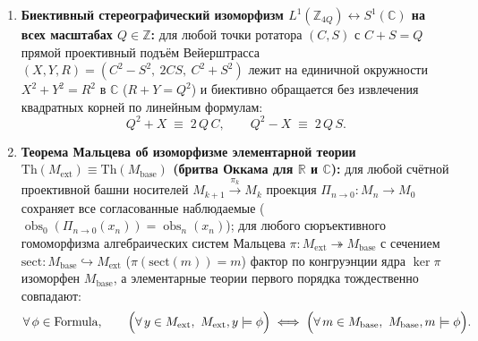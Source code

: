 \begin{theorem}
\begin{enumerate}[label=\textbf{(\arabic*)},leftmargin=*]
  \begin{equation}
    \label{eq:math-stern-brocot-wronskian}
    \Delta(p_L, q_L, p_M, q_M) \;=\; \Delta(p_M, q_M, p_R, q_R) \;\equiv\; \Delta(p_L, q_L, p_R, q_R),
  \end{equation}
  а под действием любой целочисленной матрицы уточнения $A = \begin{pmatrix} a & b \\ c & d \end{pmatrix} \in \mathrm{Mat}_{2\times 2}(\mathbb{Z})$ на концы вилки вронскиан умножается на определитель матрицы:
  \begin{equation}
    \label{eq:math-sl2-interval-wronskian}
    \Delta(p_L', q_L', p_R', q_R') \;\equiv\; (a d - b c)\,\Delta(p_L, q_L, p_R, q_R),
  \end{equation}
  при этом вдоль любого слова уточнений $w \in \mathrm{List}\,\mathbb{Z}$ свёрнутая вилка $[L_w, U_w] = \operatorname{bracketFold}(l_0, u_0, w)$ монотонно зажимает вещественное значение $X \in \mathbb{R}$ ($l_0 \le L_w \le X \le U_w \le u_0$, $0 \le U_w - L_w \le u_0 - l_0$) и однозначно определяет его при смыкании ($U_w - L_w = 0 \implies L_w = U_w = X$).
\item \textbf{Биективный стереографический изоморфизм $L^1(\mathbb{Z}_{4Q}) \leftrightarrow S^1(\mathbb{C})$ на всех масштабах $Q \in \mathbb{Z}$:}
  для любой точки ротатора $(C, S)$ с $C + S = Q$ прямой проективный подъём Вейерштрасса $(X, Y, R) = (C^2 - S^2,\ 2CS,\ C^2 + S^2)$ лежит на единичной окружности $X^2 + Y^2 = R^2$ в $\mathbb{C}$ ($R + Y = Q^2$) и биективно обращается без извлечения квадратных корней по линейным формулам:
  \begin{equation}
    \label{eq:math-weierstrass-bijection-inverse}
    Q^2 + X \;\equiv\; 2\,Q\,C, \qquad Q^2 - X \;\equiv\; 2\,Q\,S.
  \end{equation}
\item \textbf{Теорема Мальцева об изоморфизме элементарной теории $\mathrm{Th}(M_{\mathrm{ext}}) \equiv \mathrm{Th}(M_{\mathrm{base}})$ (бритва Оккама для $\mathbb{R}$ и $\mathbb{C}$):}
  для любой счётной проективной башни носителей $M_{k+1} \xrightarrow{\pi_k} M_k$ проекция $\Pi_{n \to 0} : M_n \to M_0$ сохраняет все согласованные наблюдаемые ($\operatorname{obs}_0(\Pi_{n \to 0}(x_n)) = \operatorname{obs}_n(x_n)$); для любого сюръективного гомоморфизма алгебраических систем Мальцева $\pi : M_{\mathrm{ext}} \twoheadrightarrow M_{\mathrm{base}}$ с сечением $\mathrm{sect} : M_{\mathrm{base}} \hookrightarrow M_{\mathrm{ext}}$ ($\pi(\mathrm{sect}(m)) = m$) фактор по конгруэнции ядра $\ker\pi$ изоморфен $M_{\mathrm{base}}$, а элементарные теории первого порядка тождественно совпадают:
  \begin{equation}
    \label{eq:math-malcev-elementary-equivalence}
    \forall\,\phi \in \mathrm{Formula}, \qquad
    \Bigl(\forall\,y \in M_{\mathrm{ext}},\ M_{\mathrm{ext}}, y \models \phi\Bigr)
    \;\Longleftrightarrow\;
    \Bigl(\forall\,m \in M_{\mathrm{base}},\ M_{\mathrm{base}}, m \models \phi\Bigr).
  \end{equation}
\end{enumerate}
\end{theorem}

